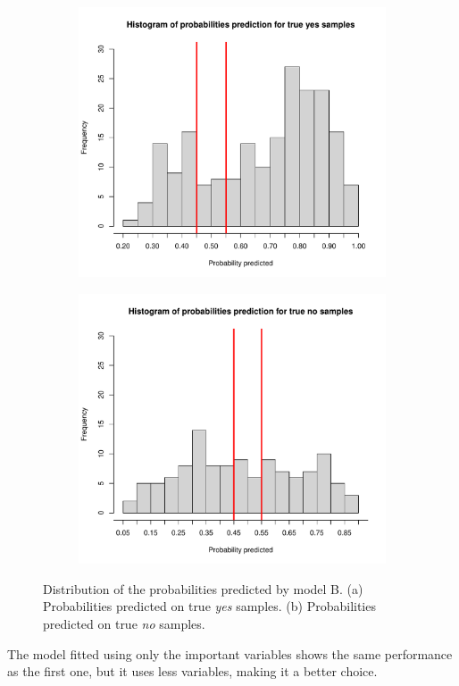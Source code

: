 \begin{figure}[h]
	\begin{subfigure}{.5\textwidth}
		\centering
		\includegraphics[width=0.7\linewidth]{ImageFiles/Classification/LogReg/probability_pred_imp_yes}
		\caption{}
		\label{fig:ProbPredYesB}
	\end{subfigure}
	\begin{subfigure}{.5\textwidth}
		\centering
		\includegraphics[width=0.7\linewidth]{ImageFiles/Classification/LogReg/probability_pred_imp_no}
		\caption{}
		\label{fig:ProbPredNoB}
	\end{subfigure}
	\caption{Distribution of the probabilities predicted by model B. (a) Probabilities predicted on true \textit{yes} samples. (b) Probabilities predicted on true \textit{no} samples.}
	\label{fig:ProbPredB}
\end{figure}

The model fitted using only the important variables shows the same performance as the first one, but it uses less variables, making it a better choice.

